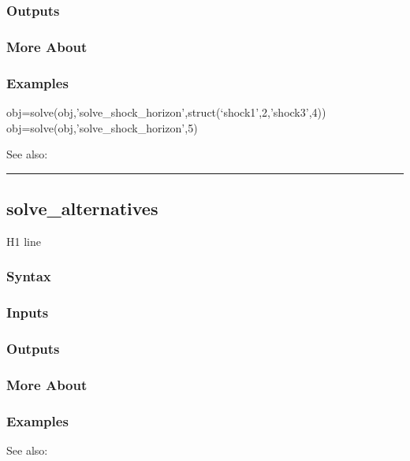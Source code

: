 \documentclass[letterpaper,10pt,english]{sphinxmanual}
\begin{document}
\subsubsection{Outputs}
\label{classes/models/@dsge/dsge:id182}

\subsubsection{More About}
\label{classes/models/@dsge/dsge:id183}

\subsubsection{Examples}
\label{classes/models/@dsge/dsge:id184}
obj=solve(obj,'solve\_shock\_horizon',struct(`shock1',2,'shock3',4))
obj=solve(obj,'solve\_shock\_horizon',5)

See also:


\bigskip\hrule{}\bigskip



\subsection{solve\_alternatives}
\label{classes/models/@dsge/dsge:id185}\label{classes/models/@dsge/dsge:solve-alternatives}
H1 line


\subsubsection{Syntax}
\label{classes/models/@dsge/dsge:id186}

\subsubsection{Inputs}
\label{classes/models/@dsge/dsge:id187}

\subsubsection{Outputs}
\label{classes/models/@dsge/dsge:id188}

\subsubsection{More About}
\label{classes/models/@dsge/dsge:id189}

\subsubsection{Examples}
\label{classes/models/@dsge/dsge:id190}
See also:
\end{document}
